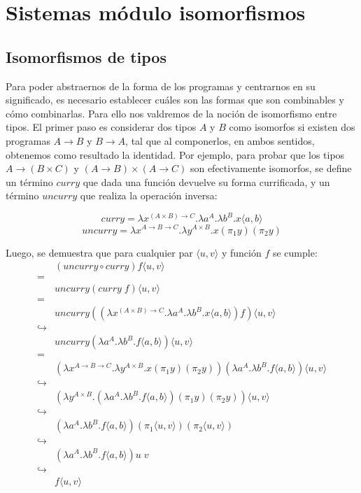 \section{Sistemas módulo isomorfismos}
\subsection{Isomorfismos de tipos}

Para poder abstraernos de la forma de los programas y centrarnos en su significado, es necesario establecer cuáles son las formas que son combinables y cómo combinarlas.
Para ello nos valdremos de la noción de isomorfismo entre tipos.
El primer paso es considerar dos tipos $A$ y $B$ como isomorfos si existen dos programas $A \rightarrow B$ y $B \rightarrow A$, tal que al componerlos, en ambos sentidos, obtenemos como resultado la identidad.
Por ejemplo, para probar que los tipos $A \rightarrow (B \times C)$ y $(A \rightarrow B) \times (A \rightarrow C)$ son efectivamente isomorfos, se define un término $curry$ que dada una función devuelve su forma currificada, y un término $uncurry$ que realiza la operación inversa:

\[ curry = \lambda x^{(A \times B) \rightarrow C}. \lambda a^A . \lambda b^B . x\langle a,b \rangle \]
\[ uncurry = \lambda x^{A \rightarrow B \rightarrow C}. \lambda y^{A \times B} . x(\pi_1 y)(\pi_2 y) \]

Luego, se demuestra que para cualquier par $\langle u,v \rangle$ y función $f$ se cumple:
{\allowdisplaybreaks
\begin{align*}
	& (uncurry \circ curry) f \langle u,v \rangle \\
	=& \\
	& uncurry (curry \; f) \langle u,v \rangle \\
	=& \\
	& uncurry ((\lambda x^{(A \times B) \rightarrow C}. \lambda a^A . \lambda b^B . x\langle a,b \rangle) f)  \langle u,v \rangle \\
	\hookrightarrow& \\
	& uncurry (\lambda a^A . \lambda b^B . f\langle a,b \rangle)  \langle u,v \rangle \\
	=& \\
	& (\lambda x^{A \rightarrow B \rightarrow C}. \lambda y^{A \times B} . x(\pi_1 y)(\pi_2 y)) (\lambda a^A . \lambda b^B . f\langle a,b \rangle)  \langle u,v \rangle \\
	\hookrightarrow& \\
	& (\lambda y^{A \times B} . (\lambda a^A . \lambda b^B . f\langle a,b \rangle)(\pi_1 y)(\pi_2 y)) \langle u,v \rangle \\
	\hookrightarrow& \\
	& (\lambda a^A . \lambda b^B . f\langle a,b \rangle)(\pi_1 \langle u,v \rangle)(\pi_2 \langle u,v \rangle) \\
	\hookrightarrow& \\
	& (\lambda a^A . \lambda b^B . f\langle a,b \rangle) u \; v \\
	\hookrightarrow& \\
	& f\langle u,v \rangle
\end{align*}
}

